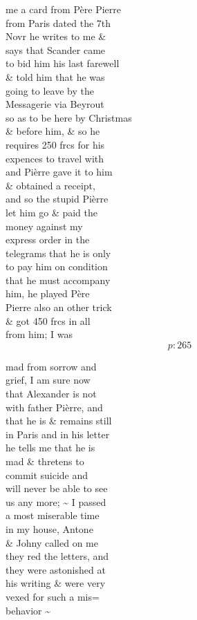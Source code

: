 \documentclass{report}
\begin{document}
	\par{
 	me a card from Père Pierre\ \\from Paris dated the 7th\ \\Novr he writes to me \&\ \\says that Scander came\ \\to bid him his last farewell\ \\\& told him that he was\ \\going to leave by the\ \\Messagerie via Beyrout\ \\so as to be here by Christmas\ \\\& before him, \& so he\ \\requires 250 frcs for his\ \\expences to travel with\ \\and Pièrre gave it to him\ \\\& obtained a receipt,\ \\and so the stupid Pièrre\ \\let him go \& paid the\ \\money against my\ \\express order in the\ \\telegrams that he is only\ \\to pay him on condition\ \\that he must accompany\ \\him, he played Père\ \\Pierre also an other trick\ \\\& got 450 frcs in all\ \\from him; I was\ \\
  \[p: 265 \]

	}



	\par{
 	mad from sorrow and\ \\grief, I am sure now\ \\that Alexander is not\ \\with father Pièrre, and\ \\that he is \& remains still\ \\in Paris and in his letter\ \\he tells me that he is\ \\mad \& thretens to\ \\commit suicide and\ \\will never be able to see\ \\us any more; \~{} I passed\ \\a most miserable time\ \\in my house, Antone\ \\\& Johny called on me\ \\they red the letters, and\ \\they were astonished at\ \\his writing \& were very\ \\vexed for such a mis=\ \\behavior \~{}\ \\
	}
\end{document}
